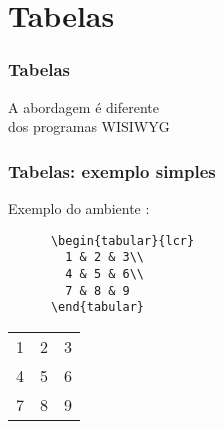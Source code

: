 \section{Tabelas}

\begin{frame}
  \frametitle{Tabelas}
  \LARGE
  A abordagem é diferente\\
  dos programas WISIWYG
\end{frame}

\begin{frame}[fragile]
  \frametitle{Tabelas: exemplo simples}
  \LARGE
  Exemplo do ambiente :
  \vspace{1em}

  \begin{minipage}{.65\textwidth}
    \begin{verbatim}
      \begin{tabular}{lcr}
        1 & 2 & 3\\
        4 & 5 & 6\\
        7 & 8 & 9
      \end{tabular}
    \end{verbatim}
  \end{minipage}
  \hspace{.05\textwidth}
  \begin{minipage}{.25\textwidth}
    \begin{tabular}{lcr}
      1 & 2 & 3\\
      4 & 5 & 6\\
      7 & 8 & 9
    \end{tabular}
  \end{minipage}
\end{frame}

